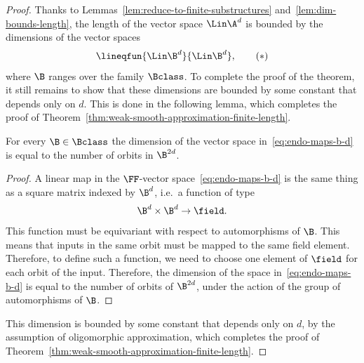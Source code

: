 \begin{proof}
    Thanks to Lemmas~\ref{lem:reduce-to-finite-substructures} and~\ref{lem:dim-bounds-length}, the length of the vector space $\Lin \A^d$ is bounded by the dimensions of the vector spaces
    \begin{align}
        \label{eq:endo-maps-b-d}
 \lineqfun { \Lin \B^d} {\Lin \B^d},\tag{$*$}
    \end{align}
    where $\B$ ranges over the family $\Bclass$.
    To complete the proof of the theorem, it still remains to show that these dimensions  are bounded by some constant that depends only on $d$. This is done in the following lemma, which   completes the    proof of Theorem~\ref{thm:weak-smooth-approximation-finite-length}. 

    \begin{lemma}\label{lem:bound-on-dim-for-finite-set} 
        For every  $\B \in \Bclass$ the dimension of the vector space  in~\eqref{eq:endo-maps-b-d} is equal to the number of orbits in $\B^{2d}$.
    \end{lemma}
    \begin{proof}
        \color{magenta}
        A linear map  in the $\FF$-vector space~\eqref{eq:endo-maps-b-d} is the same thing as a square matrix indexed by $\B^d$, i.e.~a function of type  
        \begin{align*}
        {\B^d \times \B^d} \to \field.
        \end{align*}
        This function must be equivariant with respect to automorphisms of $\B$. This means that inputs in the same orbit must be mapped to the same field element. Therefore, to define  such a function, we need to choose one element of $\field$ for each orbit of the input.   Therefore, the dimension of the space in~\eqref{eq:endo-maps-b-d} is equal to the number of orbits of $\B^{2d}$, under the action of the group of automorphisms of $\B$. 
        \color{black}
    \end{proof}
This dimension is bounded by some constant that depends only on $d$, by the assumption of oligomorphic approximation, which completes the proof of Theorem~\ref{thm:weak-smooth-approximation-finite-length}.
\end{proof}


